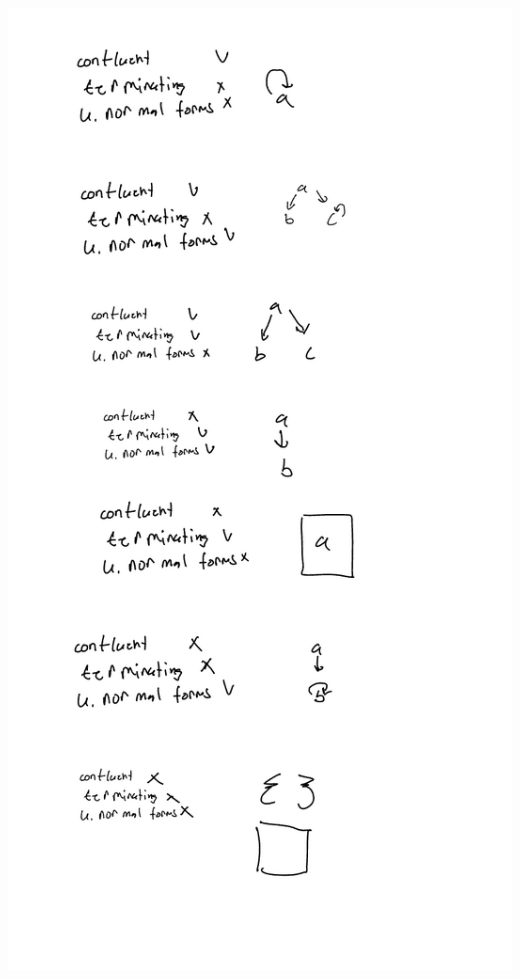 \documentclass{article}
\theoremstyle{theorem}
\theoremstyle{definition}
\theoremstyle{remark}
\begin{document}
\includegraphics[scale=0.2]{hw7.2.jpg}
\end{document}
